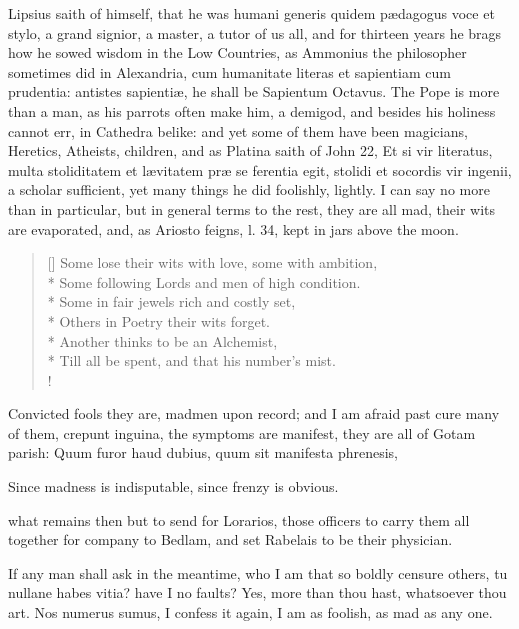 {Lipsius saith of himself, that he was humani generis quidem
p\ae{}dagogus voce et stylo, a grand signior, a master, a tutor of us all,
and for thirteen years he brags how he sowed wisdom in the Low
Countries, as Ammonius the philosopher sometimes did in Alexandria,
cum humanitate literas et sapientiam cum prudentia: antistes
sapienti\ae{}, he shall be Sapientum Octavus. The Pope is more than a man,
as his parrots often make him, a demigod, and besides his holiness
cannot err, in Cathedra belike: and yet some of them have been
magicians, Heretics, Atheists, children, and as Platina saith of John
22, Et si vir literatus, multa stoliditatem et l\ae{}vitatem pr\ae{} se
ferentia egit, stolidi et socordis vir ingenii, a scholar sufficient,
yet many things he did foolishly, lightly. I can say no more than in
particular, but in general terms to the rest, they are all mad, their
wits are evaporated, and, as Ariosto feigns, l. 34, kept in jars above
the moon.

\settowidth{\versewidth}{Till all be spent, and that his number's mist.}
\begin{verse}[\versewidth]
Some lose their wits with love, some with ambition,\\*
Some following Lords and men of high condition.\\*
Some in fair jewels rich and costly set,\\*
Others in Poetry their wits forget.\\*
Another thinks to be an Alchemist,\\*
Till all be spent, and that his number's mist.\\!
\end{verse}

Convicted fools they are, madmen upon record; and I am afraid past cure
many of them, crepunt inguina, the symptoms are manifest, they are
all of Gotam parish:
Quum furor haud dubius, quum sit manifesta phrenesis,

Since madness is indisputable, since frenzy is obvious.

what remains then but to send for Lorarios, those officers to
carry them all together for company to Bedlam, and set Rabelais to be
their physician.

If any man shall ask in the meantime, who I am that so boldly censure
others, tu nullane habes vitia? have I no faults? Yes, more than
thou hast, whatsoever thou art. Nos numerus sumus, I confess it again,
I am as foolish, as mad as any one.

}
